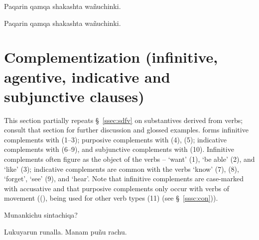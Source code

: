 %
{Paqarin qamqa shakashta wa\~nuchinki.\dag{}}%
{}%
{}{}%

%
{Paqarin qamqa shakashta wa\~nuchinki.\dag{}}%
{}%
{}{}%

\section{Complementization (infinitive, agentive, indicative and subjunctive clauses)}\label{sec:comple}
This section partially repeats \S~\ref{ssec:sdfv} on substantives derived from verbs; consult that section for further discussion and glossed examples. \SYQ{} forms infinitive complements with  (1--3); purposive complements with  (4), (5); indicative complements with  (6--9), and subjunctive complements with  (10). Infinitive complements often figure as the object of the verbs --  `want' (1),  `be able' (2), and  `like' (3); indicative complements are common with the verbs  `know' (7), (8),  `forget',  `see' (9), and  `hear'. Note that infinitive complements are case-marked with accusative  and that  purposive complements only occur with verbs of movement ((), being used for other verb types (11) (see \S~\ref{sssc:con})).

%
{\textquestiondown{}Munankichu  sintachiqa?}%
{}%
{}{}%

%
{Lukuyarun runalla. Manam pu\~nu rachu.}%
{}%
{}{}%

